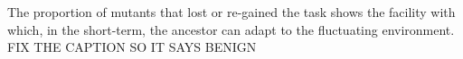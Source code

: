 The proportion of mutants that lost or re-gained the task shows the facility with which, in the short-term, the ancestor can adapt to the fluctuating environment. FIX THE CAPTION SO IT SAYS BENIGN
